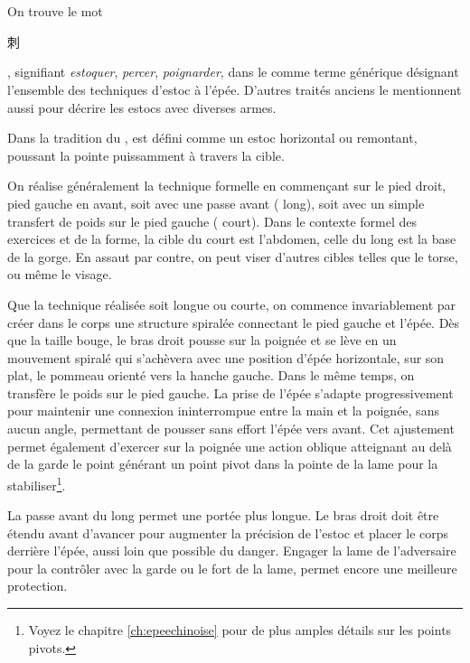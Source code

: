 \section{\Ci{}}
On trouve le mot \Ci{} \begin{CJK*}{UTF8}{bsmi}刺\end{CJK*}, signifiant \textit{estoquer}, \textit{percer}, \textit{poignarder}, dans le \WubeiZhi{} comme terme générique désignant l'ensemble des techniques d'estoc à l'épée. D'autres traités anciens le mentionnent aussi pour décrire les estocs avec diverses armes. 

Dans la tradition du \Yangjia{} \Michuan{}, \Ci{} est défini comme un estoc horizontal ou remontant, poussant la pointe puissamment à travers la cible. 

On réalise généralement la technique formelle en commençant sur le pied droit, pied gauche en avant, soit avec une passe avant (\Ci{} long), soit avec un simple transfert de poids sur le pied gauche (\Ci{} court). Dans le contexte formel des exercices et de la forme, la cible du \Ci{} court est l'abdomen, celle du long est la base de la gorge. En assaut par contre, on peut viser d'autres cibles telles que le torse, ou même le visage.

Que la technique réalisée soit longue ou courte, on commence invariablement par créer dans le corps une structure spiralée connectant le pied gauche et l'épée. Dès que la taille bouge, le bras droit pousse sur la poignée et se lève en un mouvement spiralé qui s'achèvera avec une position d'épée horizontale, sur son plat, le pommeau orienté vers la hanche gauche. Dans le même temps, on transfère le poids sur le pied gauche. La prise de l'épée s'adapte progressivement pour maintenir une connexion ininterrompue entre la main et la poignée, sans aucun angle, permettant de pousser sans effort l'épée vers avant. Cet ajustement permet également d'exercer sur la poignée une action oblique atteignant au delà de la garde le point générant un point pivot dans la pointe de la lame pour la stabiliser\footnote{Voyez le chapitre \ref*{ch:epeechinoise} pour de plus amples détails sur les points pivots.}. 


La passe avant du \Ci{} long permet une portée plus longue. Le bras droit doit être étendu avant d'avancer pour augmenter la précision de l'estoc et placer le corps derrière l'épée, aussi loin que possible du danger. Engager la lame de l'adversaire pour la contrôler avec la garde ou le fort de la lame, permet encore une meilleure protection. 

